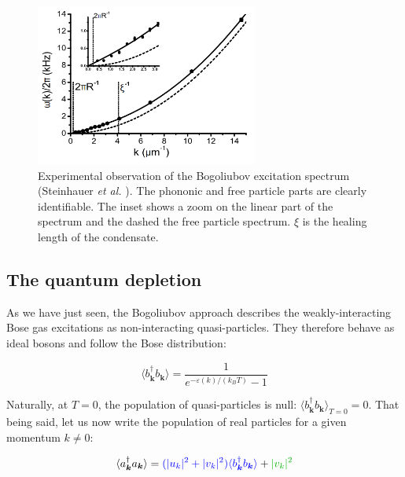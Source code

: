 \begin{figure}
    \centering
    \includegraphics[width=0.65\textwidth]{Fig/Chapter1/bogo_steinhauer.png}
    \caption{Experimental observation of the Bogoliubov excitation spectrum (Steinhauer {\it et al.} \cite{steinhauer2002excitation}). The phononic and free particle parts are clearly identifiable. The inset shows a zoom on the linear part of the spectrum and the dashed the free particle spectrum. $\xi$ is the healing length of the condensate.}
    \label{fig:my_label}
\end{figure}

\subsection{The quantum depletion}

As we have just seen, the Bogoliubov approach describes the weakly-interacting Bose gas excitations as non-interacting quasi-particles. They therefore behave as ideal bosons and follow the Bose distribution:

\begin{equation}
    \langle b^{\dagger}_{\bm{k}}  b_{\bm{k}} \rangle=\frac{1}{e^{-\varepsilon(k)/(k_B T)}-1} 
    \label{eq:bose_qp}
\end{equation}

Naturally, at $T=0$, the population of quasi-particles is null: $\langle b^{\dagger}_{\bm{k}}  b_{\bm{k}} \rangle_{T=0}=0$. That being said, let us now write the population of real particles for a given momentum $k \neq 0$:

\begin{equation}
    \langle a^{\dagger}_{\bm{k}}  a_{\bm{k}} \rangle=\textcolor{blue}{(|u_k|^2+|v_k|^2)\langle b^{\dagger}_{\bm{k}}  b_{\bm{k}} \rangle} + \textcolor{green}{|v_k|^2}
\end{equation}

